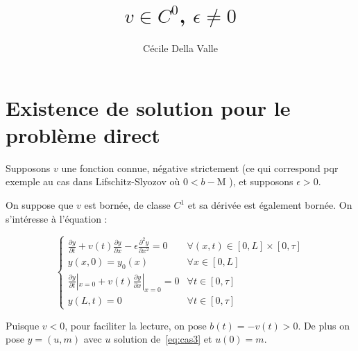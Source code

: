 \documentclass[a4paper]{article}
\title{$v \in C^0$, $\epsilon \ne 0$}
\author{Cécile Della Valle}
\newcommand{\dep}{b}
\newcommand{\mass}{\mathrm{M}}
\begin{document}
\maketitle


\section{Existence de solution pour le problème direct}


Supposons $v$ une fonction connue, négative strictement 
(ce qui correspond pqr exemple au cas dans Lifschitz-Slyozov où $0<\dep -\mass $ ), 
et supposons $\epsilon>0$. 

On suppose que $v$ est bornée, de classe $C^1$ et sa dérivée est également bornée.
On s'intéresse à l'équation :


\begin{equation}
\label{eq:cas3}
\begin{cases}
 \displaystyle \frac{\partial y}{\partial t}
 + v(t) \frac{\partial y} {\partial x}  
 - \epsilon \frac{\partial^2 y} {\partial x^2}
 = 0  & \forall (x,t) \in [0,L] \times [0, \tau]\\
 y(x,0) = y_{0} (x) & \forall x \in [0,L] \\
 \displaystyle \frac{\partial y}{\partial t}|_{x=0}
 + v(t) \frac{\partial y} {\partial x}|_{x=0} = 0 & \forall t \in [0,\tau]\\
 y(L,t)=0 & \forall t \in [0,\tau]
\end{cases}
\end{equation}

Puisque $v<0$, pour faciliter la lecture, on pose $\dep (t) = - v(t) >0$.
De plus on pose $y=(u,m)$ avec $u$ solution de~\eqref{eq:cas3} et $u(0)=m$.
\end{document}
